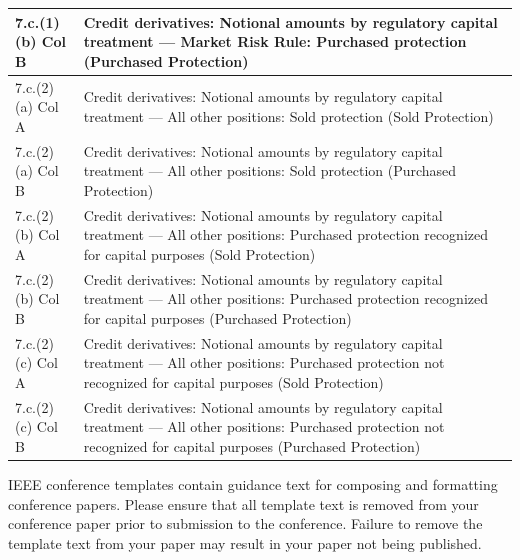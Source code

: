 \documentclass[conference]{IEEEtran}
\begin{document}
\begin{table}[htbp]
\begin{tabular}{|p{3cm}|p{12cm}|}
		\hline
		7.c.(1)(b) Col B & Credit derivatives: Notional amounts by regulatory capital treatment --- Market Risk Rule: Purchased protection (Purchased Protection) \\
		\hline
		7.c.(2)(a) Col A & Credit derivatives: Notional amounts by regulatory capital treatment --- All other positions: Sold protection (Sold Protection) \\
		\hline
		7.c.(2)(a) Col B & Credit derivatives: Notional amounts by regulatory capital treatment --- All other positions: Sold protection (Purchased Protection) \\
		\hline
		7.c.(2)(b) Col A & Credit derivatives: Notional amounts by regulatory capital treatment --- All other positions: Purchased protection recognized for capital purposes (Sold Protection) \\
		\hline
		7.c.(2)(b) Col B & Credit derivatives: Notional amounts by regulatory capital treatment --- All other positions: Purchased protection recognized for capital purposes (Purchased Protection) \\
		\hline
		7.c.(2)(c) Col A & Credit derivatives: Notional amounts by regulatory capital treatment --- All other positions: Purchased protection not recognized for capital purposes (Sold Protection) \\
		\hline
		7.c.(2)(c) Col B & Credit derivatives: Notional amounts by regulatory capital treatment --- All other positions: Purchased protection not recognized for capital purposes (Purchased Protection) \\
		\hline
	\end{tabular}
\end{table}





\vspace{12pt}
\color{red}
IEEE conference templates contain guidance text for composing and formatting conference papers. Please ensure that all template text is removed from your conference paper prior to submission to the conference. Failure to remove the template text from your paper may result in your paper not being published.
\end{document}
